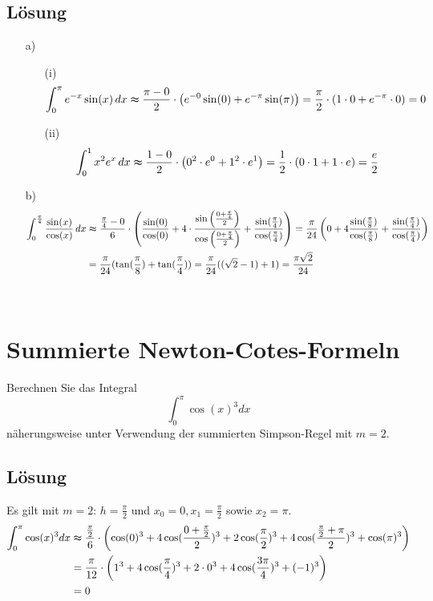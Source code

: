 \subsection*{Lösung}
\begin{itemize}
\item[a)]
	\begin{itemize}
	\item[(i)] 
		$$
			\int_0^{\pi} e^{-x}\sin(x)\, dx \thickapprox \frac{\pi-0}{2}\cdot \left(e^{-0}\sin(0)+e^{-\pi}\sin(\pi) \right)=\frac{\pi}{2}\cdot(1\cdot 0 +e^{-\pi} \cdot 0)=0 
		$$
	\item[(ii)]
		$$
			\int_0^1 x^2e^x \, dx \thickapprox \frac{1-0}{2}\cdot \left(0^2\cdot e^0 + 1^2\cdot e^1 \right)=\frac{1}{2}\cdot(0\cdot 1 + 1 \cdot e)=\frac{e}{2}
		$$
	\end{itemize}
\item[b)]
\begin{align*}
			\int_0^{\frac{\pi}{4}} \frac{\sin(x)}{\cos(x)}\, dx &\thickapprox \frac{\frac{\pi}{4}-0}{6}\cdot \left(\frac{\sin(0)}{\cos(0)}+4\cdot \frac{\sin\left(\frac{0+\frac{\pi}{4}}{2} \right)}{\cos\left(\frac{0+\frac{\pi}{4}}{2} \right)}+\frac{\sin(\frac{\pi}{4})}{\cos(\frac{\pi}{4})} \right)=\frac{\pi}{24}\left(0+4\frac{\sin(\frac{\pi}{8})}{\cos(\frac{\pi}{8})}+ \frac{\sin(\frac{\pi}{4})}{\cos(\frac{\pi}{4})}\right)\\
&=\frac{\pi}{24}(\tan(\frac{\pi}{8})+\tan(\frac{\pi}{4}))=\frac{\pi}{24}((\sqrt{2}-1)+1)=\frac{\pi\sqrt{2}}{24}
\end{align*}
\end{itemize}
\quad\\

\newpage
\section{Summierte Newton-Cotes-Formeln}
Berechnen Sie das Integral
$$
\int_0^\pi \cos(x)^3 dx
$$
näherungsweise unter Verwendung der summierten Simpson-Regel mit $m=2$.

\subsection*{Lösung}
Es gilt mit $m=2$: $h=\frac{\pi}{2}$ und $x_0=0, x_1=\frac{\pi}{2}$ sowie $x_2=\pi$.
\begin{align*}
\int_0^\pi \cos(x)^3 dx & \thickapprox \frac{\frac{\pi}{2}}{6}\cdot \left(\cos(0)^3+4\cos(\frac{0+\frac{\pi}{2}}{2})^3+2\cos(\frac{\pi}{2})^3+4\cos(\frac{\frac{\pi}{2}+\pi}{2})^3+\cos(\pi)^3 \right)\\
&=\frac{\pi}{12}\cdot \left(1^3+4 \cos(\frac{\pi}{4})^3+2\cdot 0^3+4 \cos(\frac{3\pi}{4})^3+(-1)^3 \right)\\
&=0
\end{align*}
%
%
